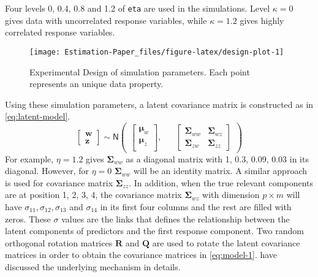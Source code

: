 \documentclass[12pt,3p,authoryear]{elsarticle}
\begin{document}
\begin{description}
Four levels 0, 0.4, 0.8 and 1.2 of \texttt{eta} are used in the simulations. Level \(\kappa=0\) gives data with uncorrelated response variables, while \(\kappa=1.2\) gives highly correlated response variables.
\end{description}

\begin{figure}
\texttt{[image: Estimation-Paper\_files/figure-latex/design-plot-1]} \caption{Experimental Design of simulation parameters. Each point represents an unique data property.}\label{fig:design-plot}
\end{figure}

Using these simulation parameters, a latent covariance matrix is constructed as in \ref{eq:latent-model}.
\begin{equation}
  \begin{bmatrix}
    \mathbf{w} \\ \mathbf{z}
  \end{bmatrix} 
  \sim \mathsf{N}
  \begin{pmatrix}
    \begin{bmatrix}
      \boldsymbol{\mu}_w \\
      \boldsymbol{\mu}_z \\
    \end{bmatrix}, &&
    \begin{bmatrix}
      \boldsymbol{\Sigma}_{ww} & \boldsymbol{\Sigma}_{wz} \\
      \boldsymbol{\Sigma}_{zw} & \boldsymbol{\Sigma}_{zz} 
    \end{bmatrix}
  \end{pmatrix}
  \label{eq:latent-model}
\end{equation}
For example, \(\eta=1.2\) gives \(\boldsymbol{\Sigma}_{ww}\) as a diagonal matrix with 1, 0.3, 0.09, 0.03 in its diagonal. However, for \(\eta=0\) \(\boldsymbol{\Sigma}_{ww}\) will be an identity matrix. A similar approach is used for covariance matrix \(\boldsymbol{\Sigma}_{zz}\). In addition, when the true relevant components are at position 1, 2, 3, 4, the covariance matrix \(\boldsymbol{\Sigma}_{wz}\) with dimension \(p \times m\) will have \(\sigma_{11}, \sigma_{12}, \sigma_{13}\) and \(\sigma_{14}\) in its first four columns and the rest are filled with zeros. These \(\sigma\) values are the links that defines the relationship between the latent components of predictors and the first response component. Two random orthogonal rotation matrices \(\mathbf{R}\) and \(\mathbf{Q}\) are used to rotate the latent covariance matrices in order to obtain the covariance matrices in \ref{eq:model-1}. \citet{Rimal2018} have discussed the underlying mechanism in details.
\end{document}
